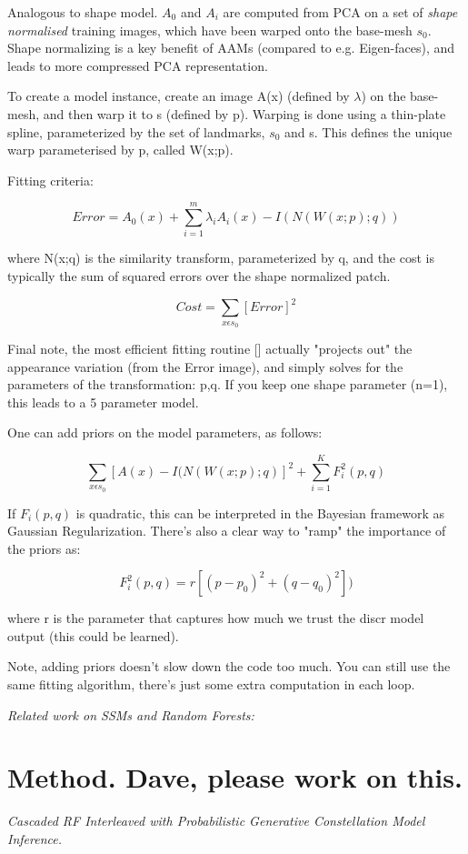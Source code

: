 \documentclass[10pt,twocolumn,letterpaper]{article}
\begin{document}
Analogous to shape model. $A_0$ and $A_i$ are computed from PCA on a set of \emph{shape normalised} training images, which have been warped onto the base-mesh $s_0$.  Shape normalizing is a key benefit of AAMs (compared to e.g. Eigen-faces), and leads to more compressed PCA representation.

To create a model instance, create an image A(x) (defined by $\lambda$) on the base-mesh, and then warp it to s (defined by p).  Warping is done using a thin-plate spline, parameterized by the set of landmarks, $s_0$ and s.  This defines the unique warp parameterised by p, called W(x;p).

Fitting criteria:

\[Error = A_0(x) + \sum_{i=1}^m \lambda_i A_i(x) - I(N(W(x;p);q)) \]

where N(x;q) is the similarity transform, parameterized by q, and the cost is typically the sum of squared errors over the shape normalized patch.

\[Cost = \sum_{x \epsilon s_0} [Error]^2 \]

Final note, the most efficient fitting routine [] actually "projects out" the appearance variation (from the Error image), and simply solves for the parameters of the transformation: p,q.  If you keep one shape parameter (n=1), this leads to a 5 parameter model.


One can add priors on the model parameters, as follows:

\[ \sum_{x \epsilon s_0} [A(x) - I(N(W(x;p);q)]^2 + \sum_{i=1}^K F_i^2(p,q) \]

If $F_i(p,q)$ is quadratic, this can be interpreted in the Bayesian framework as Gaussian Regularization.  There's also a clear way to "ramp" the importance of the priors as:

\[ F_i^2(p,q) = r[(p-p_0)^2+(q-q_0)^2]) \]

where r is the parameter that captures how much we trust the discr model output (this could be learned). 

Note, adding priors doesn't slow down the code too much.  You can still use the same fitting algorithm, there's just some extra computation in each loop.

\emph{Related work on SSMs and Random Forests: }



\section{Method. Dave, please work on this.}
\emph{Cascaded RF Interleaved with Probabilistic Generative Constellation Model Inference.}
\end{document}
